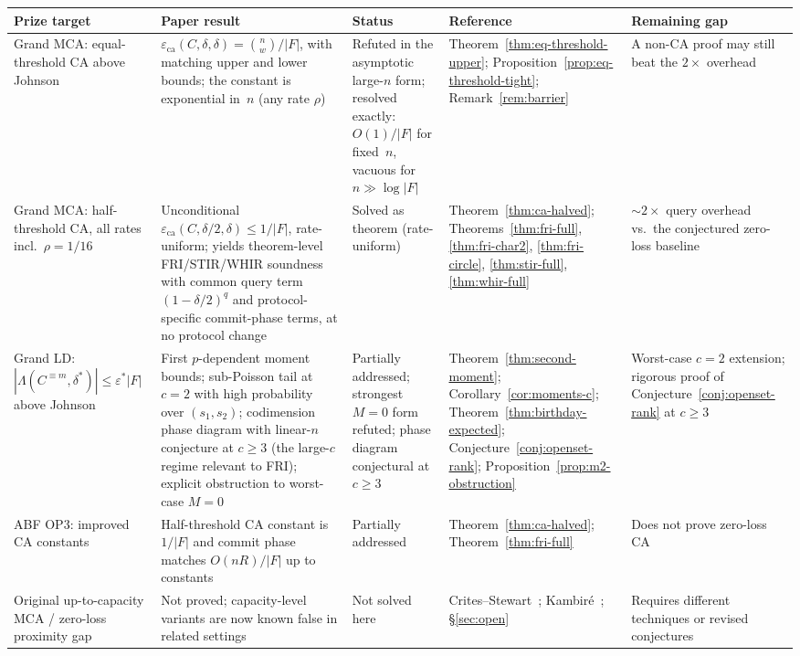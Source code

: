 \documentclass[11pt]{article}
\begin{document}
\begin{center}
\begin{adjustbox}{max width=\textwidth}
\small
\begin{tabular}{p{}p{}p{}p{}p{}}
\toprule
Prize target & Paper result & Status & Reference & Remaining gap \\
\midrule
Grand MCA: equal-threshold CA above Johnson & $\varepsilon_{\mathrm{ca}}(C,\delta,\delta) = \binom{n}{w}/|F|$, with matching upper and lower bounds; the constant is exponential in~$n$ (any rate $\rho$) & Refuted in the asymptotic large-$n$ form; resolved exactly: $O(1)/|F|$ for fixed~$n$, vacuous for $n \gg \log|F|$ & Theorem~\ref{thm:eq-threshold-upper}; Proposition~\ref{prop:eq-threshold-tight}; Remark~\ref{rem:barrier} & A non-CA proof may still beat the $2{\times}$ overhead \\
Grand MCA: half-threshold CA, all rates incl.\ $\rho = 1/16$ & Unconditional $\varepsilon_{\mathrm{ca}}(C,\delta/2,\delta) \leq 1/|F|$, rate-uniform; yields theorem-level FRI/STIR/WHIR soundness with common query term $(1-\delta/2)^q$ and protocol-specific commit-phase terms, at no protocol change & Solved as theorem (rate-uniform) & Theorem~\ref{thm:ca-halved}; Theorems~\ref{thm:fri-full}, \ref{thm:fri-char2}, \ref{thm:fri-circle}, \ref{thm:stir-full}, \ref{thm:whir-full} & ${\sim}2\times$ query overhead vs.\ the conjectured zero-loss baseline \\
Grand LD: $|\Lambda(C^{\equiv m}, \delta^*)| \leq \varepsilon^* |F|$ above Johnson & First $p$-dependent moment bounds; sub-Poisson tail at $c = 2$ with high probability over $(s_1, s_2)$; codimension phase diagram with linear-$n$ conjecture at $c \geq 3$ (the large-$c$ regime relevant to FRI); explicit obstruction to worst-case $M=0$ & Partially addressed; strongest $M=0$ form refuted; phase diagram conjectural at $c \geq 3$ & Theorem~\ref{thm:second-moment}; Corollary~\ref{cor:moments-c}; Theorem~\ref{thm:birthday-expected}; Conjecture~\ref{conj:openset-rank}; Proposition~\ref{prop:m2-obstruction} & Worst-case $c=2$ extension; rigorous proof of Conjecture~\ref{conj:openset-rank} at $c \geq 3$ \\
ABF OP3: improved CA constants & Half-threshold CA constant is $1/|F|$ and commit phase matches $O(nR)/|F|$ up to constants & Partially addressed & Theorem~\ref{thm:ca-halved}; Theorem~\ref{thm:fri-full} & Does not prove zero-loss CA \\
Original up-to-capacity MCA / zero-loss proximity gap & Not proved; capacity-level variants are now known false in related settings & Not solved here & Crites--Stewart~\cite{CritesStewart}; Kambir\'e~\cite{Kambire}; \S\ref{sec:open} & Requires different techniques or revised conjectures \\
\bottomrule
\end{tabular}
\end{adjustbox}
\end{center}
\end{document}
